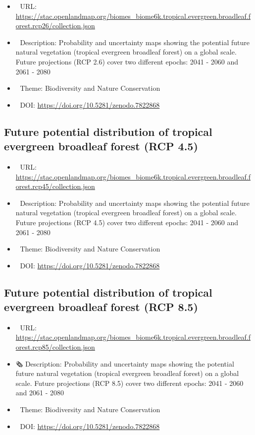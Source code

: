 \documentclass[
  graybox,natbib,nospthms]{svmono}
\providecommand{\tightlist}{%
  \setlength{\itemsep}{0pt}\setlength{\parskip}{0pt}}
\providecommand{\tightlist}{\setlength{\itemsep}{0pt}\setlength{\parskip}{0pt}}
\begin{document}
\begin{itemize}
\tightlist
\item
  🔗 URL: \url{https://stac.openlandmap.org/biomes_biome6k.tropical.evergreen.broadleaf.forest.rcp26/collection.json}
\item
  📰 Description: Probability and uncertainty maps showing the potential future natural vegetation (tropical evergreen broadleaf forest) on a global scale. Future projections (RCP 2.6) cover two different epochs: 2041 - 2060 and 2061 - 2080
\item
  📝 Theme: Biodiversity and Nature Conservation
\item
  📂 DOI: \url{https://doi.org/10.5281/zenodo.7822868}
\end{itemize}

\hypertarget{future-potential-distribution-of-tropical-evergreen-broadleaf-forest-rcp-4.5}{%
\subsection{Future potential distribution of tropical evergreen broadleaf forest (RCP 4.5)}\label{future-potential-distribution-of-tropical-evergreen-broadleaf-forest-rcp-4.5}}

\begin{itemize}
\tightlist
\item
  🔗 URL: \url{https://stac.openlandmap.org/biomes_biome6k.tropical.evergreen.broadleaf.forest.rcp45/collection.json}
\item
  📰 Description: Probability and uncertainty maps showing the potential future natural vegetation (tropical evergreen broadleaf forest) on a global scale. Future projections (RCP 4.5) cover two different epochs: 2041 - 2060 and 2061 - 2080
\item
  📝 Theme: Biodiversity and Nature Conservation
\item
  📂 DOI: \url{https://doi.org/10.5281/zenodo.7822868}
\end{itemize}

\hypertarget{future-potential-distribution-of-tropical-evergreen-broadleaf-forest-rcp-8.5}{%
\subsection{Future potential distribution of tropical evergreen broadleaf forest (RCP 8.5)}\label{future-potential-distribution-of-tropical-evergreen-broadleaf-forest-rcp-8.5}}

\begin{itemize}
\tightlist
\item
  🔗 URL: \url{https://stac.openlandmap.org/biomes_biome6k.tropical.evergreen.broadleaf.forest.rcp85/collection.json}
\item
  🗞 Description: Probability and uncertainty maps showing the potential future natural vegetation (tropical evergreen broadleaf forest) on a global scale. Future projections (RCP 8.5) cover two different epochs: 2041 - 2060 and 2061 - 2080
\item
  📝 Theme: Biodiversity and Nature Conservation
\item
  📂 DOI: \url{https://doi.org/10.5281/zenodo.7822868}
\end{itemize}
\end{document}
